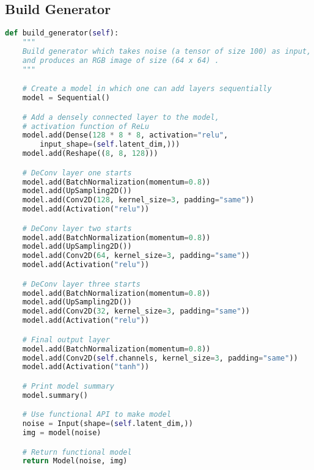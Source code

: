 \subsection{Build Generator} %
\label{subsec:building_generator}
\begin{lstlisting}[basicstyle=\scriptsize,language=Python]
def build_generator(self):
    """
    Build generator which takes noise (a tensor of size 100) as input,
    and produces an RGB image of size (64 x 64) .
    """

    # Create a model in which one can add layers sequentially
    model = Sequential()

    # Add a densely connected layer to the model, 
    # activation function of ReLu
    model.add(Dense(128 * 8 * 8, activation="relu", 
        input_shape=(self.latent_dim,)))
    model.add(Reshape((8, 8, 128)))

    # DeConv layer one starts
    model.add(BatchNormalization(momentum=0.8))
    model.add(UpSampling2D())
    model.add(Conv2D(128, kernel_size=3, padding="same"))
    model.add(Activation("relu"))

    # DeConv layer two starts
    model.add(BatchNormalization(momentum=0.8))
    model.add(UpSampling2D())
    model.add(Conv2D(64, kernel_size=3, padding="same"))
    model.add(Activation("relu"))

    # DeConv layer three starts
    model.add(BatchNormalization(momentum=0.8))
    model.add(UpSampling2D())
    model.add(Conv2D(32, kernel_size=3, padding="same"))
    model.add(Activation("relu"))

    # Final output layer
    model.add(BatchNormalization(momentum=0.8))
    model.add(Conv2D(self.channels, kernel_size=3, padding="same"))
    model.add(Activation("tanh"))

    # Print model summary
    model.summary()

    # Use functional API to make model
    noise = Input(shape=(self.latent_dim,))
    img = model(noise)

    # Return functional model
    return Model(noise, img)

\end{lstlisting}
\par\bigskip


